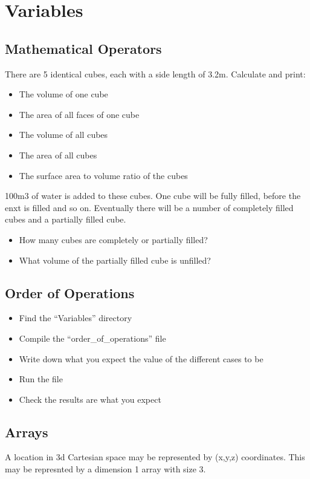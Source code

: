 \documentclass[11pt,a4paper]{article}
\begin{document}
\section{Variables}

\subsection{Mathematical Operators}
There are 5 identical cubes, each with a side length of 3.2m. Calculate and print:

\begin{itemize}
    \item The volume of one cube
    \item The area of all faces of one cube
    \item The volume of all cubes
    \item The area of all cubes
    \item The surface area to volume ratio of the cubes
\end{itemize}

100m3 of water is added to these cubes. One cube will be fully filled, before the enxt is filled and so on. Eventually there will be a number of completely filled cubes and a partially filled cube.

\begin{itemize}
    \item How many cubes are completely or partially filled?
    \item What volume of the partially filled cube is unfilled?
\end{itemize}


\subsection{Order of Operations}
\begin{itemize}
    \item Find the “Variables” directory
    \item Compile the “order\_of\_operations” file
    \item Write down what you expect the value of the different cases to be
    \item Run the file
    \item Check the results are what you expect
\end{itemize}



\subsection{Arrays}
A location in 3d Cartesian space may be represented by (x,y,z) coordinates. This may be represnted by a dimension 1 array with size 3.
\end{document}

